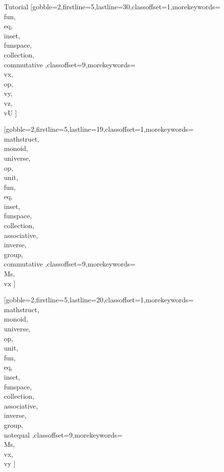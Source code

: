 \documentclass[lang={en,de}]{stex}
\begin{document}
\begin{sfragment}{Tutorial}
    [gobble=2,firstline=5,lastline=30,classoffset=1,morekeywords={
    \\fun,\\eq,\\inset,
    \\funspace,\\collection,\\commutative
    },classoffset=9,morekeywords={
      \\vx,\\op,\\vy,\\vz,\\vU
    }]

    [gobble=2,firstline=5,lastline=19,classoffset=1,morekeywords={
    \\mathstruct,\\monoid,\\universe,\\op,\\unit,\\fun,\\eq,\\inset,
    \\funspace,\\collection,\\associative,\\inverse,\\group,
    \\commutative
    },classoffset=9,morekeywords={
      \\Ms,\\vx
    }]

    [gobble=2,firstline=5,lastline=20,classoffset=1,morekeywords={
    \\mathstruct,\\monoid,\\universe,\\op,\\unit,\\fun,\\eq,\\inset,
    \\funspace,\\collection,\\associative,\\inverse,\\group,\\notequal
    },classoffset=9,morekeywords={
      \\Ms,\\vx,\\vy
    }]


\end{sfragment}
\end{document}

